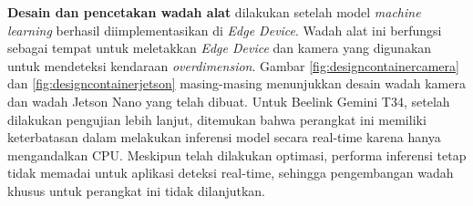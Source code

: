 \textbf{Desain dan pencetakan wadah alat} dilakukan setelah model \emph{machine learning} berhasil diimplementasikan di \emph{Edge Device}. Wadah alat ini berfungsi sebagai tempat untuk meletakkan \emph{Edge Device} dan kamera yang digunakan untuk mendeteksi kendaraan \emph{overdimension}. Gambar \ref{fig:designcontainercamera} dan \ref{fig:designcontainerjetson} masing-masing menunjukkan desain wadah kamera dan wadah Jetson Nano yang telah dibuat. Untuk Beelink Gemini T34, setelah dilakukan pengujian lebih lanjut, ditemukan bahwa perangkat ini memiliki keterbatasan dalam melakukan inferensi model secara real-time karena hanya mengandalkan CPU. Meskipun telah dilakukan optimasi, performa inferensi tetap tidak memadai untuk aplikasi deteksi real-time, sehingga pengembangan wadah khusus untuk perangkat ini tidak dilanjutkan.


